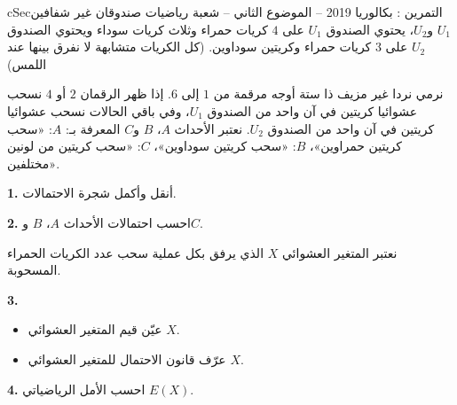 \documentclass[12pt,a4paper]{article}
\newenvironment{BOX}[2]{\begin{otherlanguage}{english}\begin{arbox}{#1}{#2}}{\end{arbox}\end{otherlanguage}}
\newcounter{exo}
\newenvironment{tamrin}[1]{\stepcounter{exo}\begin{BOX}{cSec}{التمرين \theexo: #1}}{\end{BOX}}
\newenvironment{LTR}{\begin{otherlanguage}{english}}{\end{otherlanguage}}
\renewcommand{\ldots}{\mathinner{\ldotp\ldotp\ldotp}}
\newenvironment{sq}{\begin{itemize}[leftmargin=2.4em,itemsep=3pt]}{\end{itemize}}
\newcommand{\qa}{\item[(أ)]}\newcommand{\qb}{\item[(ب)]}\newcommand{\qc}{\item[(جـ)]}\newcommand{\qd}{\item[(د)]}\newcommand{\qe}{\item[(هـ)]}
\newcommand{\QQ}[1]{\par\smallskip\textbf{#1.} }
\begin{document}
\begin{tamrin}{بكالوريا 2019 -- الموضوع الثاني -- شعبة رياضيات}
صندوقان غير شفافين $U_1$ و$U_2$، يحتوي الصندوق $U_1$ على $4$ كريات حمراء وثلاث كريات سوداء ويحتوي الصندوق $U_2$ على $3$ كريات حمراء وكريتين سوداوين. (كل الكريات متشابهة لا نفرق بينها عند اللمس)

نرمي نردا غير مزيف ذا ستة أوجه مرقمة من $1$ إلى $6$.
إذا ظهر الرقمان $2$ أو $4$ نسحب عشوائيا كريتين في آن واحد من الصندوق $U_1$، وفي باقي الحالات نسحب عشوائيا كريتين في آن واحد من الصندوق $U_2$.
نعتبر الأحداث $A$، $B$ و$C$ المعرفة بـ: $A$: «سحب كريتين حمراوين»، $B$: «سحب كريتين سوداوين»، $C$: «سحب كريتين من لونين مختلفين».
\begin{center}\begin{LTR}\end{LTR}\end{center}
\QQ{1} أنقل وأكمل شجرة الاحتمالات.
\QQ{2} احسب احتمالات الأحداث $A$، $B$ و$C$.

نعتبر المتغير العشوائي $X$ الذي يرفق بكل عملية سحب عدد الكريات الحمراء المسحوبة.
\QQ{3}
\begin{sq}
\qa عيّن قيم المتغير العشوائي $X$.
\qb عرّف قانون الاحتمال للمتغير العشوائي $X$.
\end{sq}
\QQ{4} احسب الأمل الرياضياتي $E(X)$.
\end{tamrin}
\end{document}
